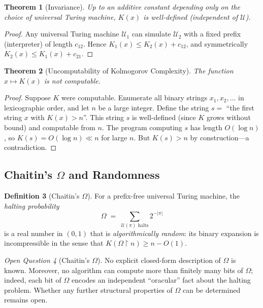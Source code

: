\documentclass[12pt,a4paper]{amsart}
\newtheorem{theorem}{Theorem}[section]
\theoremstyle{definition}
\newtheorem{definition}[theorem]{Definition}
\theoremstyle{remark}
\newtheorem{openquestion}[theorem]{Open Question}
\begin{document}
\begin{theorem}[Invariance]\label{thm:invariance}
Up to an additive constant depending only on the choice of universal Turing machine,
$K(x)$ is well-defined (independent of $\mathcal{U}$).
\end{theorem}
\begin{proof}
Any universal Turing machine $\mathcal{U}_1$ can simulate $\mathcal{U}_2$ with a
fixed prefix (interpreter) of length $c_{12}$. Hence $K_1(x) \leq K_2(x) +
c_{12}$, and symmetrically $K_2(x) \leq K_1(x) + c_{21}$.
\end{proof}

\begin{theorem}[Uncomputability of Kolmogorov Complexity]\label{thm:kolmogorov-uncomputable}
The function $x \mapsto K(x)$ is not computable.
\end{theorem}
\begin{proof}
Suppose $K$ were computable. Enumerate all binary strings $x_1, x_2, \ldots$ in
lexicographic order, and let $n$ be a large integer. Define the string
$s = $ ``the first string $x$ with $K(x) > n$''. This string $s$ is well-defined
(since $K$ grows without bound) and computable from $n$. The program computing
$s$ has length $O(\log n)$, so $K(s) = O(\log n) \ll n$ for large $n$. But
$K(s) > n$ by construction—a contradiction.
\end{proof}

\subsection{Chaitin's $\Omega$ and Randomness}

\begin{definition}[Chaitin's $\Omega$]
For a prefix-free universal Turing machine, the \emph{halting probability}
\[
  \Omega \;=\; \sum_{\mathcal{U}(\pi)\text{ halts}} 2^{-|\pi|}
\]
is a real number in $(0,1)$ that is \emph{algorithmically random}: its binary
expansion is incompressible in the sense that $K(\Omega \upharpoonright n) \geq n -
O(1)$.
\end{definition}

\begin{openquestion}[Chaitin's $\Omega$]
No explicit closed-form description of $\Omega$ is known. Moreover, no algorithm
can compute more than finitely many bits of $\Omega$; indeed, each bit of $\Omega$
encodes an independent ``oracular'' fact about the halting problem. Whether any
further structural properties of $\Omega$ can be determined remains open.
\end{openquestion}
\end{document}
